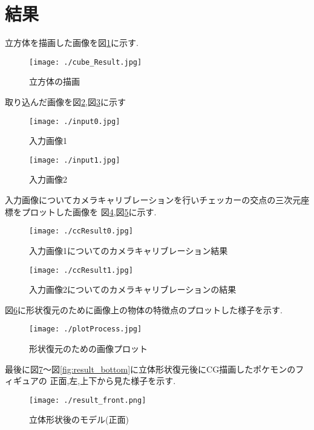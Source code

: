 \documentclass[11pt,a4j]{jsarticle}
\begin{document}
    \section{結果}
    立方体を描画した画像を図\ref{fig:cube}に示す.
    \begin{figure}[H]
      \centering
      \texttt{[image: ./cube\_Result.jpg]}
      \caption{立方体の描画\label{fig:cube}}
    \end{figure}
    取り込んだ画像を図\ref{fig:input1},図\ref{fig:input2}に示す
    \begin{figure}[H]
      \centering
      \texttt{[image: ./input0.jpg]}
      \caption{入力画像1\label{fig:input1}}
    \end{figure}
    \begin{figure}[H]
      \centering
      \texttt{[image: ./input1.jpg]}
      \caption{入力画像2\label{fig:input2}}
    \end{figure}
    入力画像についてカメラキャリブレーションを行いチェッカーの交点の三次元座標をプロットした画像を
    図\ref{fig:cc_input1},図\ref{fig:cc_input2}に示す.
    \begin{figure}[H]
      \centering
      \texttt{[image: ./ccResult0.jpg]}
      \caption{入力画像1についてのカメラキャリブレーション結果\label{fig:cc_input1}}
    \end{figure}
    \begin{figure}[H]
      \centering
      \texttt{[image: ./ccResult1.jpg]}
      \caption{入力画像2についてのカメラキャリブレーションの結果\label{fig:cc_input2}}
    \end{figure}
    図\ref{fig:plotProcess}に形状復元のために画像上の物体の特徴点のプロットした様子を示す.
    \begin{figure}[H]
      \centering
      \texttt{[image: ./plotProcess.jpg]}
      \caption{形状復元のための画像プロット\label{fig:plotProcess}}
    \end{figure}
    最後に図\ref{fig:result_front}〜図\ref{fig:result_bottom}に立体形状復元後にCG描画したポケモンのフィギュアの
    正面,左,上下から見た様子を示す.
    \begin{figure}[H]
      \centering
      \texttt{[image: ./result\_front.png]}
      \caption{立体形状後のモデル(正面)\label{fig:result_front}}
    \end{figure}
\end{document}
